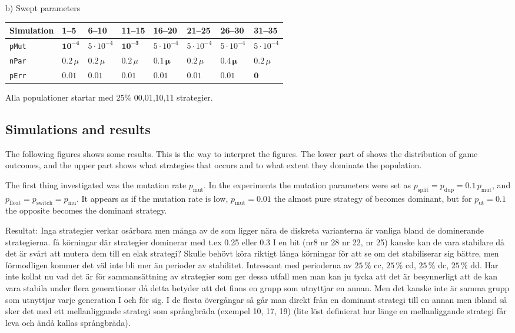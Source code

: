 \begin{table}[!hbtp]
  b) Swept parameters\myhalfpar

  \newcommand \temp {$5\cdot 10^{-4}$}
  \begin{tabular}{*{8}{l}}
    Simulation    & 1--5               & 6--10    & 11--15    & 16--20   & 21--25   & 26--30   & 31--35   \\
    \hline
    \texttt{pMut} & $\mathbf{10^{-4}}$ & \temp       & $\mathbf{10^{-3}}$ & \temp       & \temp       & \temp       & \temp       \\
    \texttt{nPar} & $0.2\,\mu$          & $0.2\,\mu$ & $0.2\,\mu$  & $\mathbf{0.1\,\mu}$ & $0.2\,\mu$ & $\mathbf{0.4\,\mu}$ & $0.2\,\mu$ \\
    \texttt{pErr} & $0.01$             & $0.01$   & $0.01$    & $0.01$   & $0.01$   & $0.01$   & $\mathbf{0}$ 
  \end{tabular}
\end{table}

Alla populationer startar med $25 \%$ 00,01,10,11 strategier.\mypar %

\subsection{Simulations and results}
The following figures shows some results. This is the way to interpret the figures. The lower part of shows the distribution of game outcomes, and the upper part shows what strategies that occurs and to what extent they dominate the population.\mypar

The first thing investigated was the mutation rate $p_{\textrm{mut}}$. In the experiments the mutation parameters were set as $p_{\textrm{split}} = p_{\textrm{dup}} = 0.1\,p_{\textrm{mut}}$, and$ p_{\textrm{float}} = p_{\textrm{switch}} = p_{\textrm{mu}}$. It appears as if the mutation rate is low, $p_{\textrm{mut}}=0.01$ the almost pure strategy of  becomes dominant, but for $p_{\textrm{ut}}=0.1$ the opposite  becomes the dominant strategy.\mypar

Resultat: Inga strategier verkar osårbara men många av de som ligger nära de diskreta varianterna är
vanliga bland de dominerande strategierna. få körningar där strategier dominerar med t.ex 0.25 eller
0.3 I en bit (nr8 nr 28 nr 22, nr 25) kanske kan de vara stabilare då det är svårt att mutera dem till en
elak strategi? Skulle behövt köra riktigt långa körningar för att se om det stabiliserar sig bättre, men
förmodligen kommer det väl inte bli mer än perioder av stabilitet. Intressant med perioderna av $25\,\%$
cc, $25\,\%$ cd, $25\,\%$ dc, $25\,\%$ dd. Har inte kollat nu vad det är för sammansättning av strategier som ger
dessa utfall men man kan ju tycka att det är besynnerligt att de kan vara stabila under flera
generationer då detta betyder att det finns en grupp som utnyttjar en annan. Men det kanske inte är
samma grupp som utnyttjar varje generation I och för sig. I de flesta övergångar så går man direkt
från en dominant strategi till en annan men ibland så sker det med ett mellanliggande strategi som
språngbräda (exempel 10, 17, 19) (lite löst definierat hur länge en mellanliggande strategi får leva och
ändå kallas språngbräda).

